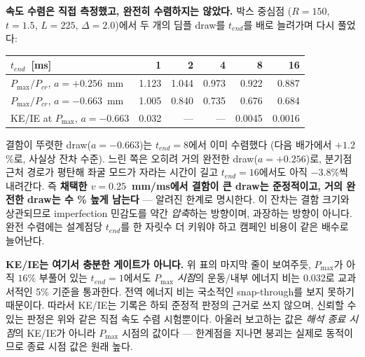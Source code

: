 \documentclass[11pt]{article}
\begin{document}
\begin{enumerate}
      \textbf{속도 수렴은 직접 측정했고, 완전히 수렴하지는 않았다.} 박스 중심점
      ($R{=}150$, $t{=}1.5$, $L{=}225$, $\Delta{=}2.0$)에서 두 개의 딤플 draw를
      $t_{end}$를 배로 늘려가며 다시 풀었다:

      \begin{center}
      \begin{tabular}{lrrrrr}
        \toprule
        $t_{end}$~[ms] & 1 & 2 & 4 & 8 & 16 \\
        \midrule
        $P_{\max}/P_{cr}$, $a{=}{+}0.256$~mm & 1.123 & 1.044 & 0.973 & 0.922 & 0.887 \\
        $P_{\max}/P_{cr}$, $a{=}{-}0.663$~mm & 1.005 & 0.840 & 0.735 & 0.676 & 0.684 \\
        \midrule
        KE/IE at $P_{\max}$, $a{=}{-}0.663$ & 0.032 & --- & --- & 0.0045 & 0.0016 \\
        \bottomrule
      \end{tabular}
      \end{center}

      결함이 뚜렷한 draw($a{=}{-}0.663$)는 $t_{end}{=}8$에서 이미 수렴했다
      (다음 배가에서 $+1.2$\%로, 사실상 잔차 수준). 느린 쪽은 오히려 거의
      완전한 draw($a{=}{+}0.256$)로, 분기점 근처 경로가 평탄해 좌굴 모드가
      자라는 시간이 길고 $t_{end}{=}16$에서도 아직 $-3.8$\%씩 내려간다. 즉
      \textbf{채택한 $v = 0.25$~mm/ms에서 결함이 큰 draw는 준정적이고, 거의
      완전한 draw는 수 \% 높게 남는다} --- 알려진 한계로 명시한다. 이 잔차는
      결함 크기와 상관되므로 imperfection 민감도를 약간 \emph{압축}하는
      방향이며, 과장하는 방향이 아니다. 완전 수렴에는 설계점당 $t_{end}$를
      한 자릿수 더 키워야 하고 캠페인 비용이 같은 배수로 늘어난다.

      \textbf{KE/IE는 여기서 충분한 게이트가 아니다.} 위 표의 마지막 줄이
      보여주듯, $P_{\max}$가 아직 $16$\% 부풀어 있는 $t_{end}{=}1$에서도 $P_{\max}$
      \emph{시점}의 운동/내부 에너지 비는 $0.032$로 교과서적인 5\% 기준을
      통과한다. 전역 에너지 비는 국소적인 snap-through를 보지 못하기 때문이다.
      따라서 KE/IE는 기록은 하되 준정적 판정의 근거로 쓰지 않으며, 신뢰할 수
      있는 판정은 위와 같은 직접 속도 수렴 시험뿐이다. 아울러 보고하는 값은
      \emph{해석 종료 시점}의 KE/IE가 아니라 $P_{\max}$ 시점의 값이다 --- 한계점을
      지나면 붕괴는 실제로 동적이므로 종료 시점 값은 원래 높다.


\end{enumerate}
\end{document}
